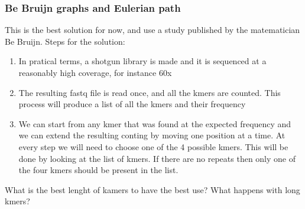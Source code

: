 \subsubsection{Be Bruijn graphs and Eulerian path}
This is the best solution for now, and use a study published by the
matematician Be Bruijn.
Steps for the solution:
\begin{enumerate}
  \item In pratical terms, a shotgun library is made and it is sequenced at a
reasonably high coverage, for instance 60x
  \item The resulting fastq file is read once, and all the kmers are counted.
This process will produce a list of all the kmers and their frequency
  \item We can start from any kmer that was found at the expected frequency and
we can extend the resulting conting by moving one position at a time. At every
step we will need to choose one of the 4 possible kmers. This will be done by
looking at the list of kmers. If there are no repeats then only one of the four
kmers should be present in the list.
\end{enumerate}

What is the best lenght of kamers to have the best use? What happens with long
kmers?
